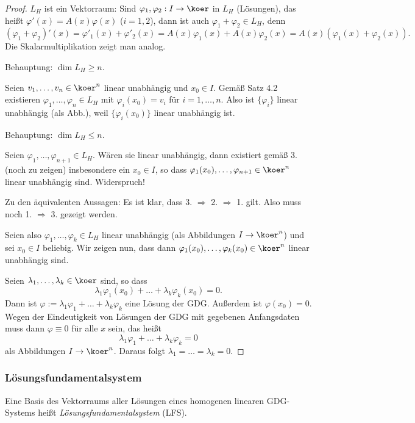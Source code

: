 \begin{proof}
 $L_H$ ist ein Vektorraum: Sind $\varphi_1, \varphi_2: I \to \koer$ in $L_H$ (Lösungen), das heißt $\varphi'(x) = A(x) \varphi(x)$ ($i=1,2$), dann ist auch $\varphi_1 + \varphi_2 \in L_H$, denn
 \[ (\varphi_1 + \varphi_2)'(x) = \varphi'_1(x) + \varphi'_2(x) = A(x) \varphi_1(x) + A(x) \varphi_2(x) = A(x) (\varphi_1(x) + \varphi_2(x)). \]
 Die Skalarmultiplikation zeigt man analog.
 
 Behauptung: $\dim L_H \ge n$.
 
 Seien $v_1, \ldots, v_n \in \koer^n$ linear unabhängig und $x_0 \in I$. Gemäß Satz 4.2 existieren $\varphi_1, \ldots, \varphi_n \in L_H$ mit $\varphi_i(x_0) = v_i$ für $i = 1, \ldots, n$. Also ist $\{ \varphi_i \}$ linear unabhängig (als Abb.), weil $\{ \varphi_i(x_0) \}$ linear unabhängig ist.
 
 Behauptung: $\dim L_H \le n$.
 
 Seien $\varphi_1, \ldots, \varphi_{n+1} \in L_H$. Wären sie linear unabhängig, dann existiert gemäß 3. (noch zu zeigen) insbesondere ein $x_0 \in I$, so dass $\varphi_1(x_0), \ldots, \varphi_{n+1} \in \koer^n$ linear unabhängig sind. Widerspruch!
 
 Zu den äquivalenten Aussagen: Es ist klar, dass 3. $\Rightarrow$ 2. $\Rightarrow$ 1. gilt. Also muss noch 1. $\Rightarrow$ 3. gezeigt werden.
 
 Seien also $\varphi_1, \ldots, \varphi_k \in L_H$ linear unabhängig (als Abbildungen $I \to \koer^n$) und sei $x_0 \in I$ beliebig. Wir zeigen nun, dass dann $\varphi_1(x_0), \ldots, \varphi_k(x_0) \in \koer^n$ linear unabhängig sind. 
 
 Seien $\lambda_1, \ldots, \lambda_k \in \koer$ sind, so dass
 \[ \lambda_1 \varphi_1(x_0) + \ldots + \lambda_k \varphi_k(x_0) = 0. \]
 Dann ist $\varphi := \lambda_1 \varphi_1 + \ldots + \lambda_k \varphi_k$ eine Lösung der GDG. Außerdem ist $\varphi(x_0) = 0$. Wegen der Eindeutigkeit von Lösungen der GDG mit gegebenen Anfangsdaten muss dann $\varphi \equiv 0$ für alle $x$ sein, das heißt 
 \[ \lambda_1 \varphi_1 + \ldots + \lambda_k \varphi_k = 0 \]
 als Abbildungen $I \to \koer^n$. Daraus folgt $\lambda_1 = \ldots = \lambda_k = 0$.
\end{proof}

\subsubsection{Lösungsfundamentalsystem}
Eine Basis des Vektorraums aller Lösungen eines homogenen linearen GDG-Systems
heißt \emph{Lösungsfundamentalsystem} (LFS).

